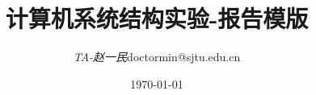\documentclass[12pt,a4paper]{ctexart}
\title{\textbf{计算机系统结构实验-报告模版}} %
\author{
\begin{tabular}{ll}
  \textit{TA-赵一民} & doctormin@sjtu.edu.cn \\
\end{tabular}
}
\date{\today} %
\begin{document}
\maketitle %

\tableofcontents


\pagebreak





\pagebreak


%
%
\end{document}
